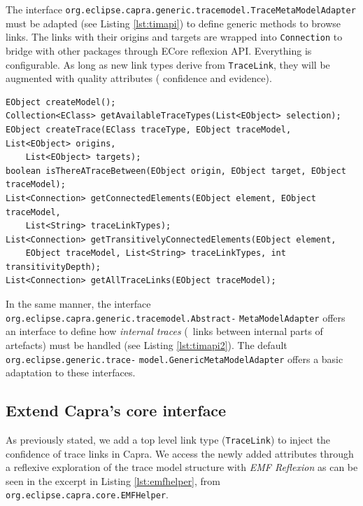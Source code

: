 The interface  \verb|org.eclipse.capra.generic.tracemodel.TraceMetaModelAdapter| must be adapted (see Listing \ref{lst:timapi}) to define generic methods to browse links. The links with their origins and targets are wrapped into \texttt{Connection} to bridge with other packages through ECore reflexion API. Everything is configurable. As long as new link types derive from \texttt{TraceLink}, they will be augmented with quality attributes (\textit{\ie} confidence and evidence).
\begin{lstlisting}[caption={TraceMetaModelAdapter interface},
label=lst:timapi,
style=mystylexcore,
frame=shadowbox, 
rulesepcolor=\color{blue},
morekeywords={class,contains,abstract,extends,\{,\},\[,\],refers,derived,String,get,int,double,List,Connection,EObject,void,String,boolean,Collection,EClass},
linewidth=17.5cm,
xleftmargin=0.3cm
]
EObject createModel();
Collection<EClass> getAvailableTraceTypes(List<EObject> selection);
EObject createTrace(EClass traceType, EObject traceModel, List<EObject> origins, 
    List<EObject> targets);
boolean isThereATraceBetween(EObject origin, EObject target, EObject traceModel);
List<Connection> getConnectedElements(EObject element, EObject traceModel, 
    List<String> traceLinkTypes);
List<Connection> getTransitivelyConnectedElements(EObject element, 
    EObject traceModel, List<String> traceLinkTypes, int transitivityDepth);
List<Connection> getAllTraceLinks(EObject traceModel);
\end{lstlisting}

In the same manner, the interface \verb|org.eclipse.capra.generic.tracemodel.Abstract-| \verb|MetaModelAdapter| offers an interface to define how \textit{internal traces} (\textit{\ie}~links between internal parts of artefacts) must be handled (see Listing \ref{lst:timapi2}).
The default \verb|org.eclipse.generic.trace-| \verb|model.GenericMetaModelAdapter| offers a basic adaptation to these interfaces.

 

\subsection{Extend Capra's core interface}
As previously stated, we add a top level link type (\texttt{TraceLink}) to inject the confidence of trace links in Capra. We access the newly added attributes through a reflexive exploration of the trace model structure with \textit{EMF Reflexion} as can be seen in the excerpt in Listing \ref{lst:emfhelper}, from \verb|org.eclipse.capra.core.EMFHelper|.  



